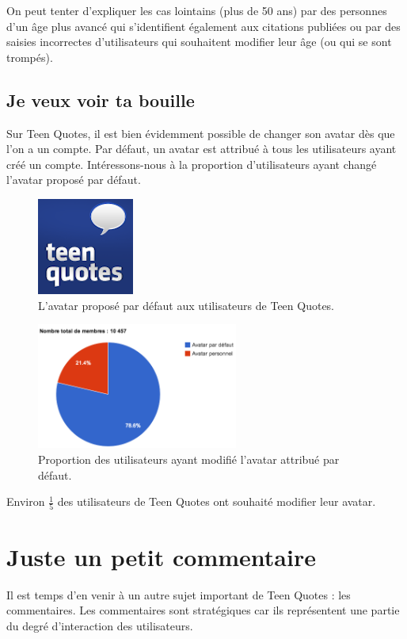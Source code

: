 \documentclass{report}
\begin{document}
	On peut tenter d'expliquer les cas lointains (plus de 50 ans) par des personnes d'un âge plus avancé qui s'identifient également aux citations publiées ou par des saisies incorrectes d'utilisateurs qui souhaitent modifier leur âge (ou qui se sont trompés).

	\section{Je veux voir ta bouille}
	Sur Teen Quotes, il est bien évidemment possible de changer son avatar dès que l'on a un compte. Par défaut, un avatar est attribué à tous les utilisateurs ayant créé un compte. Intéressons-nous à la proportion d'utilisateurs ayant changé l'avatar proposé par défaut.
	\begin{figure}[H]
		\center
		\includegraphics{images/avatarDefaut.png}
		\caption{L'avatar proposé par défaut aux utilisateurs de Teen Quotes.}
	\end{figure}

	\begin{figure}[H]
		\center
		\includegraphics[width=250px]{images/partAvatar.png}
		\caption{Proportion des utilisateurs ayant modifié l'avatar attribué par défaut.}
	\end{figure}
	Environ $\frac{1}{5}$ des utilisateurs de Teen Quotes ont souhaité modifier leur avatar.

	\chapter{Juste un petit commentaire}
	Il est temps d'en venir à un autre sujet important de Teen Quotes : les commentaires. Les commentaires sont stratégiques car ils représentent une partie du degré d'interaction des utilisateurs.
\end{document}
